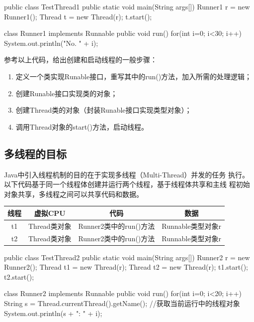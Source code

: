 
\begin{javaCode}
public class TestThread1 {
  public static void main(String args[]) {
    Runner1 r = new Runner1();
    Thread t = new Thread(r);
    t.start();
  }
}

class Runner1 implements Runnable {
  public void run() {
    for(int i=0; i<30; i++) {
      System.out.println("No. " + i);
    }
  }
}
\end{javaCode}

参考以上代码，给出创建和启动线程的一般步骤：

\begin{enumerate}
\item 定义一个类实现Runable接口，重写其中的run()方法，加入所需的处理逻辑；
\item 创建Runable接口实现类的对象；
\item 创建Thread类的对象（封装Runable接口实现类型对象）；
\item 调用Thread对象的start()方法，启动线程。
\end{enumerate}

\subsection{多线程的目标}

Java中引入线程机制的目的在于实现{\hei 多线程（Multi-Thread）}并发的任务
执行。以下代码基于同一个线程体创建并运行两个线程，基于线程体共享和主线
程初始对象共享，多线程之间可以共享代码和数据。

\begin{table}[!htbp]
\centering
\begin{tabular}{|c|c|c|c|}
  \hline
  {\bf 线程} & {\bf 虚拟CPU} & {\bf 代码} & {\bf 数据} \\
  \hline
  t1 & Thread类对象 & Runner2类中的run()方法 & Runnable类型对象r \\
  \hline
  t2 & Thread类对象 & Runner2类中的run()方法 & Runnable类型对象r \\
  \hline
\end{tabular}
\end{table}


\begin{javaCode}
public class TestThread2 {
  public static void main(String args[]) {
    Runner2 r = new Runner2();
    Thread t1 = new Thread(r);
    Thread t2 = new Thread(r);
    t1.start();
    t2.start();
  }
}

class Runner2 implements Runnable {
  public void run() {
    for(int i=0; i<20; i++) {
      String s = Thread.currentThread().getName(); //获取当前运行中的线程对象
      System.out.println(s + ": " + i);
    }
  }
}
\end{javaCode}

